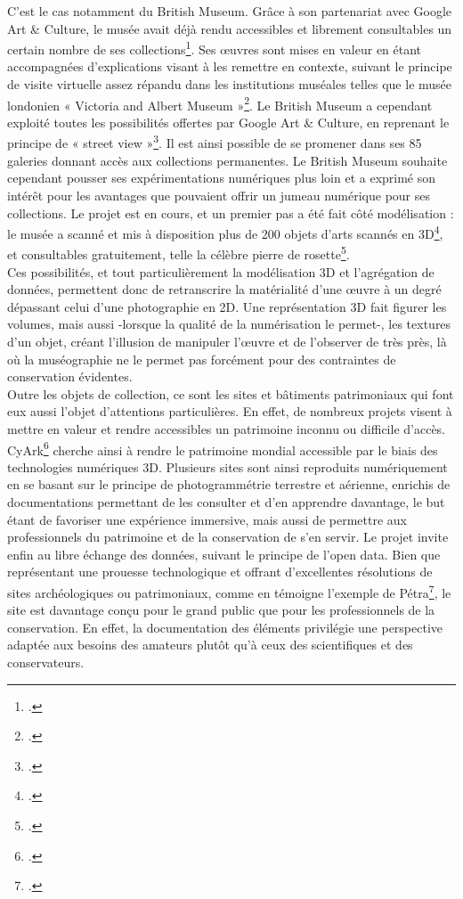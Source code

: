 C'est le cas notamment du British Museum. Grâce à son partenariat avec Google Art \& Culture, le musée avait déjà rendu accessibles et librement consultables un certain nombre de ses collections\footcite{BritishMuseumLondon}. Ses œuvres sont mises en valeur en étant accompagnées d'explications visant à les remettre en contexte, suivant le principe de visite virtuelle assez répandu dans les institutions muséales telles que le musée londonien « Victoria and Albert Museum »\footcite{ExploreCollections}. Le British Museum a cependant exploité toutes les possibilités offertes par Google Art \& Culture, en reprenant le principe de « street view »\footcite{BritishMuseumLondon}. Il est ainsi possible de se promener dans ses 85 galeries donnant accès aux collections permanentes. Le British Museum souhaite cependant pousser ses expérimentations numériques plus loin et a exprimé son intérêt pour les avantages que pouvaient offrir un jumeau numérique pour ses collections. Le projet est en cours, et un premier pas a été fait côté modélisation : le musée a scanné et mis à disposition plus de 200 objets d'arts scannés en 3D\footcite{BritishMuseum}, et consultables gratuitement, telle la célèbre pierre de rosette\footcite{RosettaStoneDownload2017}.\\ 

Ces possibilités, et tout particulièrement la modélisation 3D et l'agrégation de données, permettent donc de retranscrire la matérialité d’une œuvre à un degré dépassant celui d’une photographie en 2D. Une représentation 3D fait figurer les volumes, mais aussi -lorsque la qualité de la numérisation le permet-, les textures d’un objet, créant l’illusion de manipuler l’œuvre et de l’observer de très près, là où la muséographie ne le permet pas forcément pour des contraintes de conservation évidentes.\\

Outre les objets de collection, ce sont les sites et bâtiments patrimoniaux qui font eux aussi l'objet d'attentions particulières. En effet, de nombreux projets visent à mettre en valeur et rendre accessibles un patrimoine inconnu ou difficile d'accès.\\

CyArk\footcite{CyArk} cherche ainsi à rendre le patrimoine mondial accessible par le biais des technologies numériques 3D. Plusieurs sites sont ainsi reproduits numériquement en se basant sur le principe de photogrammétrie terrestre et aérienne, enrichis de documentations permettant de les consulter et d'en apprendre davantage, le but étant de favoriser une expérience immersive, mais aussi de permettre aux professionnels du patrimoine et de la conservation de s’en servir. Le projet invite enfin au libre échange des données, suivant le principe de l'open data. Bien que représentant une prouesse technologique et offrant d'excellentes résolutions de sites archéologiques ou patrimoniaux, comme en témoigne l’exemple de Pétra\footcite{AdDeirMonastery}, le site est davantage conçu pour le grand public que pour les professionnels de la conservation. En effet, la documentation des éléments privilégie une perspective adaptée aux besoins des amateurs plutôt qu'à ceux des scientifiques et des conservateurs.\\

